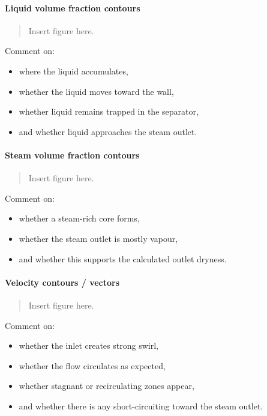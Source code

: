 \documentclass[
  11pt,
]{article}
\providecommand{\tightlist}{%
  \setlength{\itemsep}{0pt}\setlength{\parskip}{0pt}}
\begin{document}
\paragraph{Liquid volume fraction
contours}\label{liquid-volume-fraction-contours}

\begin{quote}
Insert figure here.
\end{quote}

Comment on:

\begin{itemize}
\tightlist
\item
  where the liquid accumulates,
\item
  whether the liquid moves toward the wall,
\item
  whether liquid remains trapped in the separator,
\item
  and whether liquid approaches the steam outlet.
\end{itemize}

\paragraph{Steam volume fraction
contours}\label{steam-volume-fraction-contours}

\begin{quote}
Insert figure here.
\end{quote}

Comment on:

\begin{itemize}
\tightlist
\item
  whether a steam-rich core forms,
\item
  whether the steam outlet is mostly vapour,
\item
  and whether this supports the calculated outlet dryness.
\end{itemize}

\paragraph{Velocity contours / vectors}\label{velocity-contours-vectors}

\begin{quote}
Insert figure here.
\end{quote}

Comment on:

\begin{itemize}
\tightlist
\item
  whether the inlet creates strong swirl,
\item
  whether the flow circulates as expected,
\item
  whether stagnant or recirculating zones appear,
\item
  and whether there is any short-circuiting toward the steam outlet.
\end{itemize}
\end{document}
